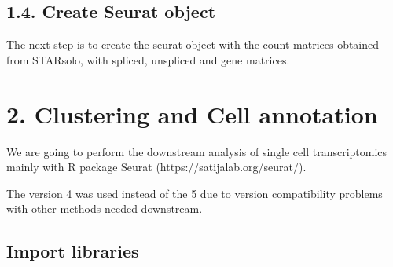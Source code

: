 \documentclass[
  letterpaper,
  DIV=11,
  numbers=noendperiod]{scrreprt}
\begin{document}
\section{1.4. Create Seurat object}\label{create-seurat-object}

The next step is to create the seurat object with the count matrices
obtained from STARsolo, with spliced, unspliced and gene matrices.

\begin{tcolorbox}[enhanced jigsaw, coltitle=black, breakable, opacityback=0, colframe=quarto-callout-note-color-frame, colback=white, opacitybacktitle=0.6, bottomrule=.15mm, titlerule=0mm, rightrule=.15mm, leftrule=.75mm, toprule=.15mm, colbacktitle=quarto-callout-note-color!10!white, bottomtitle=1mm, left=2mm, toptitle=1mm, title=\textcolor{quarto-callout-note-color}{\faInfo}\hspace{0.5em}{{[}The file is named ``1-4\_merge\_seurat\_fixedrank.R''{]}}, arc=.35mm]

\end{tcolorbox}

\chapter{2. Clustering and Cell
annotation}\label{clustering-and-cell-annotation}

We are going to perform the downstream analysis of single cell
transcriptomics mainly with R package Seurat
(https://satijalab.org/seurat/).

The version 4 was used instead of the 5 due to version compatibility
problems with other methods needed downstream.

\section{Import libraries}\label{import-libraries}
\end{document}

